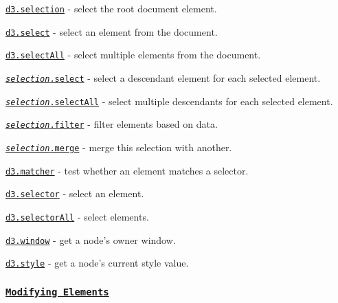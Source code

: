 \begin{DoxyItemize}
\item \href{https://github.com/d3/d3-selection/blob/master/README.md#selection}{\tt d3.\+selection} -\/ select the root document element.
\item \href{https://github.com/d3/d3-selection/blob/master/README.md#select}{\tt d3.\+select} -\/ select an element from the document.
\item \href{https://github.com/d3/d3-selection/blob/master/README.md#selectAll}{\tt d3.\+select\+All} -\/ select multiple elements from the document.
\item \href{https://github.com/d3/d3-selection/blob/master/README.md#selection_select}{\tt {\itshape selection}.select} -\/ select a descendant element for each selected element.
\item \href{https://github.com/d3/d3-selection/blob/master/README.md#selection_selectAll}{\tt {\itshape selection}.select\+All} -\/ select multiple descendants for each selected element.
\item \href{https://github.com/d3/d3-selection/blob/master/README.md#selection_filter}{\tt {\itshape selection}.filter} -\/ filter elements based on data.
\item \href{https://github.com/d3/d3-selection/blob/master/README.md#selection_merge}{\tt {\itshape selection}.merge} -\/ merge this selection with another.
\item \href{https://github.com/d3/d3-selection/blob/master/README.md#matcher}{\tt d3.\+matcher} -\/ test whether an element matches a selector.
\item \href{https://github.com/d3/d3-selection/blob/master/README.md#selector}{\tt d3.\+selector} -\/ select an element.
\item \href{https://github.com/d3/d3-selection/blob/master/README.md#selectorAll}{\tt d3.\+selector\+All} -\/ select elements.
\item \href{https://github.com/d3/d3-selection/blob/master/README.md#window}{\tt d3.\+window} -\/ get a node’s owner window.
\item \href{https://github.com/d3/d3-selection/blob/master/README.md#style}{\tt d3.\+style} -\/ get a node’s current style value.
\end{DoxyItemize}

\subsubsection*{\href{https://github.com/d3/d3-selection/blob/master/README.md#modifying-elements}{\tt Modifying Elements}}


